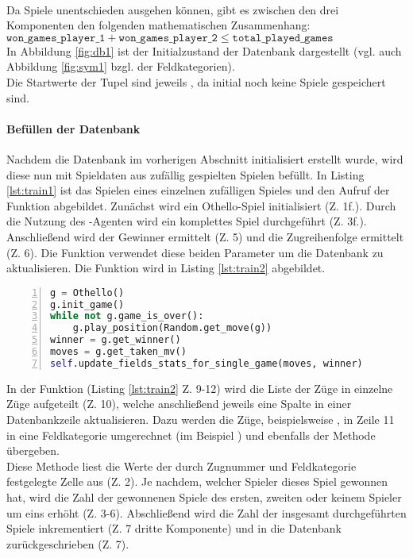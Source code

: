 \\Da Spiele unentschieden ausgehen können, gibt es zwischen den drei Komponenten den folgenden mathematischen Zusammenhang: 
\\$\mathtt{won\_games\_player\_1} + \mathtt{won\_games\_player\_2} \le \mathtt{total\_played\_games}$
\\In Abbildung \ref{fig:db1} ist der Initialzustand der Datenbank dargestellt (vgl. auch Abbildung \ref{fig:sym1} bzgl. der Feldkategorien). 
\\
Die Startwerte der Tupel sind jeweils , da initial noch keine Spiele gespeichert sind.
\paragraph{Befüllen der Datenbank}
\label{para:train1}
Nachdem die Datenbank im vorherigen Abschnitt initialisiert erstellt wurde, wird diese nun mit Spieldaten aus zufällig gespielten Spielen befüllt. In Listing \ref{lst:train1} ist das Spielen eines einzelnen zufälligen Spieles und den Aufruf der Funktion  abgebildet. Zunächst wird ein Othello-Spiel initialisiert (Z. 1f.). Durch die Nutzung des -Agenten wird ein komplettes Spiel durchgeführt (Z. 3f.). Anschließend wird der Gewinner ermittelt (Z. 5) und die Zugreihenfolge ermittelt (Z. 6). Die Funktion  verwendet diese beiden Parameter um die Datenbank zu aktualisieren. Die Funktion wird in Listing \ref{lst:train2} abgebildet.
\begin{lstlisting}[basicstyle=\footnotesize, caption = {Befüllen der Datenbank 1}, language = python, captionpos = t , numbers=left, label={lst:train1}]
g = Othello()
g.init_game()
while not g.game_is_over():
	g.play_position(Random.get_move(g))
winner = g.get_winner()
moves = g.get_taken_mv()
self.update_fields_stats_for_single_game(moves, winner)
\end{lstlisting}
In der Funktion  (Listing \ref{lst:train2} Z. 9-12) wird die Liste der Züge in einzelne Züge aufgeteilt (Z. 10), welche anschließend jeweils eine Spalte in einer Datenbankzeile aktualisieren. Dazu werden die Züge, beispielsweise , in Zeile 11 in eine Feldkategorie umgerechnet (im Beispiel ) und ebenfalls der Methode  übergeben.
\\Diese Methode liest die Werte der durch Zugnummer und Feldkategorie festgelegte Zelle aus (Z. 2). Je nachdem, welcher Spieler dieses Spiel gewonnen hat, wird die Zahl der gewonnenen Spiele des ersten, zweiten oder keinem Spieler um eins erhöht (Z. 3-6). Abschließend wird die Zahl der insgesamt durchgeführten Spiele inkrementiert (Z. 7 dritte Komponente) und in die Datenbank zurückgeschrieben (Z. 7).
